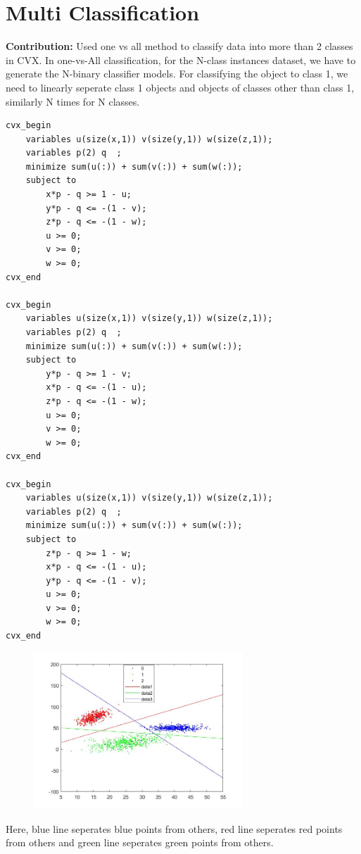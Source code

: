 \documentclass{article}
\begin{document}
\section{Multi Classification}
\textbf{Contribution:} Used one vs all method to classify data into more than 2 classes in CVX. In one-vs-All classification, for the N-class instances dataset, we have to generate the N-binary classifier models. For classifying the object to class 1, we need to linearly seperate class 1 objects and objects of classes other than class 1, similarly N times for N classes.
\begin{verbatim}
cvx_begin
    variables u(size(x,1)) v(size(y,1)) w(size(z,1));
    variables p(2) q  ;
    minimize sum(u(:)) + sum(v(:)) + sum(w(:));
    subject to
        x*p - q >= 1 - u;
        y*p - q <= -(1 - v);
        z*p - q <= -(1 - w);
        u >= 0;
        v >= 0;
        w >= 0;
cvx_end
  
cvx_begin
    variables u(size(x,1)) v(size(y,1)) w(size(z,1));
    variables p(2) q  ;
    minimize sum(u(:)) + sum(v(:)) + sum(w(:));
    subject to
        y*p - q >= 1 - v;
        x*p - q <= -(1 - u);
        z*p - q <= -(1 - w);
        u >= 0;
        v >= 0;
        w >= 0;
cvx_end
    
cvx_begin
    variables u(size(x,1)) v(size(y,1)) w(size(z,1));
    variables p(2) q  ;
    minimize sum(u(:)) + sum(v(:)) + sum(w(:));
    subject to
        z*p - q >= 1 - w;
        x*p - q <= -(1 - u);
        y*p - q <= -(1 - v);
        u >= 0;
        v >= 0;
        w >= 0;
cvx_end
\end{verbatim}
\begin{figure}[h!]
    \includegraphics[width=0.7\textwidth, center ]{data6.jpg}
\end{figure}
Here, blue line seperates blue points from others, red line seperates red points from others and green line seperates green points from others.
\end{document}
